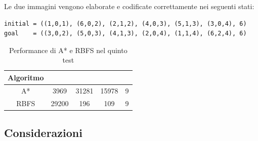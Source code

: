 \documentclass{article}
\begin{document}
	\noindent Le due immagini vengono elaborate e codificate correttamente nei seguenti stati:
	\begin{verbatim}
initial = ((1,0,1), (6,0,2), (2,1,2), (4,0,3), (5,1,3), (3,0,4), 6)
goal    = ((3,0,2), (5,0,3), (4,1,3), (2,0,4), (1,1,4), (6,2,4), 6)
	\end{verbatim}
	
	\begin{table}[H]
		\centering
		\def\arraystretch{1.5}
		\begin{tabular}{|c|c|c|c|c|}
			\hline
			\textbf{Algoritmo} & \bm{$n$} & \bm{$m$} & \bm{$\mu$} & \bm{$l$} \\
			\hline
			A* & 3969 & 31281 & 15978 & 9 \\
			\hline
			RBFS &  29200 & 196 & 109 & 9 \\
			\hline
			
		\end{tabular}
		\caption{Performance di A* e RBFS nel quinto test}
		\label{tab:exp5}
	\end{table}

	\subsection{Considerazioni}
\end{document}

